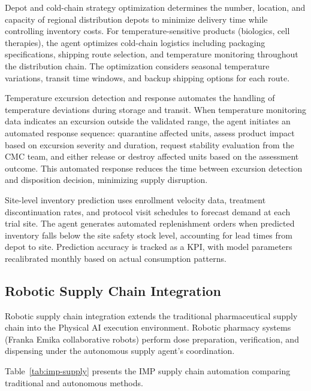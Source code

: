 Depot and cold-chain strategy optimization determines the number, location, and capacity
of regional distribution depots to minimize delivery time while controlling inventory
costs. For temperature-sensitive products (biologics, cell therapies), the agent optimizes
cold-chain logistics including packaging specifications, shipping route selection, and
temperature monitoring throughout the distribution chain. The optimization considers
seasonal temperature variations, transit time windows, and backup shipping options for
each route.

Temperature excursion detection and response automates the handling of temperature
deviations during storage and transit. When temperature monitoring data indicates an
excursion outside the validated range, the agent initiates an automated response sequence:
quarantine affected units, assess product impact based on excursion severity and duration,
request stability evaluation from the CMC team, and either release or destroy affected
units based on the assessment outcome. This automated response reduces the time between
excursion detection and disposition decision, minimizing supply disruption.

Site-level inventory prediction uses enrollment velocity data, treatment discontinuation
rates, and protocol visit schedules to forecast demand at each trial site. The agent
generates automated replenishment orders when predicted inventory falls below the site
safety stock level, accounting for lead times from depot to site. Prediction accuracy is
tracked as a KPI, with model parameters recalibrated monthly based on actual consumption
patterns.

\subsection{Robotic Supply Chain Integration}

Robotic supply chain integration extends the traditional pharmaceutical supply chain into
the Physical AI execution environment. Robotic pharmacy systems (Franka Emika collaborative
robots) perform dose preparation, verification, and dispensing under the autonomous supply
agent's coordination.

Table~\ref{tab:imp-supply} presents the IMP supply chain automation comparing traditional
and autonomous methods.


